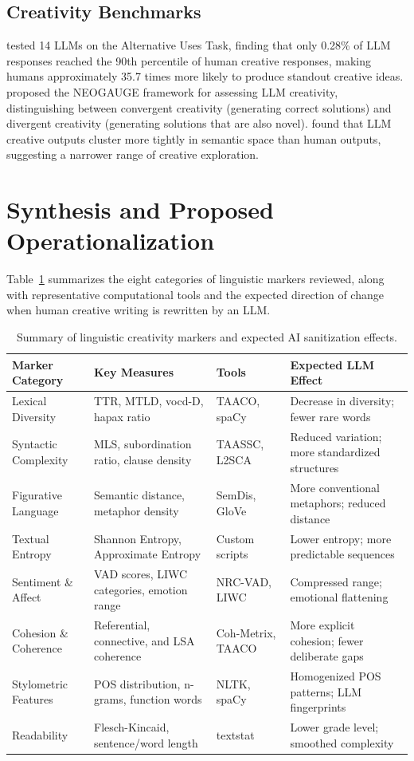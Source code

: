 \documentclass[12pt,a4paper]{article}
\begin{document}
\subsection{Creativity Benchmarks}

\citet{llm_creativity_peaked2025} tested 14 LLMs on the Alternative Uses Task, finding that only 0.28\% of LLM responses reached the 90th percentile of human creative responses, making humans approximately 35.7 times more likely to produce standout creative ideas. \citet{wang2025benchmarking} proposed the NEOGAUGE framework for assessing LLM creativity, distinguishing between convergent creativity (generating correct solutions) and divergent creativity (generating solutions that are also novel). \citet{chakrabarty2024creativity} found that LLM creative outputs cluster more tightly in semantic space than human outputs, suggesting a narrower range of creative exploration.

\section{Synthesis and Proposed Operationalization}

Table~\ref{tab:markers} summarizes the eight categories of linguistic markers reviewed, along with representative computational tools and the expected direction of change when human creative writing is rewritten by an LLM.

\begin{table}[htbp]
\centering
\small
\caption{Summary of linguistic creativity markers and expected AI sanitization effects.}
\label{tab:markers}
\begin{tabular}{p{3.2cm}p{3.5cm}p{2.5cm}p{3.8cm}}
\toprule
\textbf{Marker Category} & \textbf{Key Measures} & \textbf{Tools} & \textbf{Expected LLM Effect} \\
\midrule
Lexical Diversity & TTR, MTLD, vocd-D, hapax ratio & TAACO, spaCy & Decrease in diversity; fewer rare words \\
Syntactic Complexity & MLS, subordination ratio, clause density & TAASSC, L2SCA & Reduced variation; more standardized structures \\
Figurative Language & Semantic distance, metaphor density & SemDis, GloVe & More conventional metaphors; reduced distance \\
Textual Entropy & Shannon Entropy, Approximate Entropy & Custom scripts & Lower entropy; more predictable sequences \\
Sentiment \& Affect & VAD scores, LIWC categories, emotion range & NRC-VAD, LIWC & Compressed range; emotional flattening \\
Cohesion \& Coherence & Referential, connective, and LSA coherence & Coh-Metrix, TAACO & More explicit cohesion; fewer deliberate gaps \\
Stylometric Features & POS distribution, n-grams, function words & NLTK, spaCy & Homogenized POS patterns; LLM fingerprints \\
Readability & Flesch-Kincaid, sentence/word length & textstat & Lower grade level; smoothed complexity \\
\bottomrule
\end{tabular}
\end{table}
\end{document}
